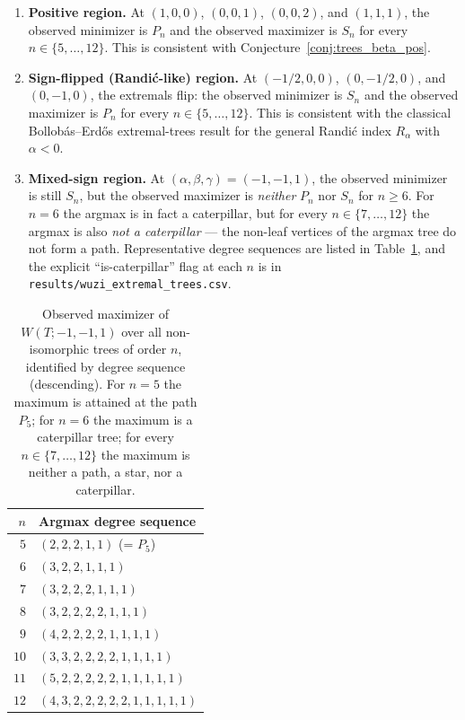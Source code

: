 \documentclass[11pt,a4paper]{article}
\theoremstyle{definition}
\begin{document}
\begin{enumerate}[label=(\alph*)]
\item \textbf{Positive region.} At $(1, 0, 0)$, $(0, 0, 1)$,
$(0, 0, 2)$, and $(1, 1, 1)$, the observed minimizer is $P_n$ and
the observed maximizer is $S_n$ for every $n \in \{5, \ldots, 12\}$.
This is consistent with Conjecture~\ref{conj:trees_beta_pos}.

\item \textbf{Sign-flipped (Randi\'c-like) region.} At
$(-1/2, 0, 0)$, $(0, -1/2, 0)$, and $(0, -1, 0)$, the extremals
flip: the observed minimizer is $S_n$ and the observed maximizer
is $P_n$ for every $n \in \{5, \ldots, 12\}$. This is consistent
with the classical Bollob\'as--Erd\H{o}s extremal-trees result for
the general Randi\'c index $R_\alpha$ with $\alpha < 0$.

\item \textbf{Mixed-sign region.} At $(\alpha, \beta, \gamma) = (-1, -1, 1)$,
the observed minimizer is still $S_n$, but the observed maximizer
is \emph{neither} $P_n$ nor $S_n$ for $n \ge 6$. For $n = 6$ the
argmax is in fact a caterpillar, but for every $n \in \{7, \ldots, 12\}$
the argmax is also \emph{not a caterpillar} --- the non-leaf
vertices of the argmax tree do not form a path. Representative
degree sequences are listed in
Table~\ref{tab:caterpillar_argmax}, and the explicit
``is-caterpillar'' flag at each $n$ is in
\texttt{results/wuzi\_extremal\_trees.csv}.
\end{enumerate}

\begin{table}[h]
\centering
\caption{Observed maximizer of $W(T; -1, -1, 1)$ over all non-isomorphic trees of order $n$, identified by degree sequence (descending). For $n = 5$ the maximum is attained at the path $P_5$; for $n = 6$ the maximum is a caterpillar tree; for every $n \in \{7, \ldots, 12\}$ the maximum is neither a path, a star, nor a caterpillar.}
\label{tab:caterpillar_argmax}
\begin{tabular}{rl}
\toprule
$n$ & Argmax degree sequence\\
\midrule
$5$  & $(2, 2, 2, 1, 1)$ \quad (= $P_5$)\\
$6$  & $(3, 2, 2, 1, 1, 1)$\\
$7$  & $(3, 2, 2, 2, 1, 1, 1)$\\
$8$  & $(3, 2, 2, 2, 2, 1, 1, 1)$\\
$9$  & $(4, 2, 2, 2, 2, 1, 1, 1, 1)$\\
$10$ & $(3, 3, 2, 2, 2, 2, 1, 1, 1, 1)$\\
$11$ & $(5, 2, 2, 2, 2, 2, 1, 1, 1, 1, 1)$\\
$12$ & $(4, 3, 2, 2, 2, 2, 2, 1, 1, 1, 1, 1)$\\
\bottomrule
\end{tabular}
\end{table}
\end{document}
